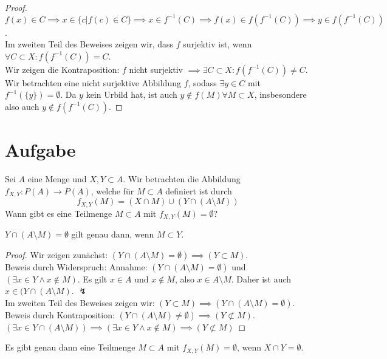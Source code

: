 \documentclass{article}
\begin{document}
\begin{enumerate}[a)]
\begin{proof}
		\[f(x)\in C\implies x \in \{c|f(c)\in C\} \implies x \in f^{-1}(C)\implies f(x) \in f(f^{-1}(C)) \implies y \in f(f^{-1}(C))\].\\
		Im zweiten Teil des Beweises zeigen wir, dass $f$ surjektiv ist, wenn $\forall C\subset X: f(f^{-1}(C)) = C$.\\
		Wir zeigen die Kontraposition: $f$ nicht surjektiv $\implies \exists C \subset X: f(f^{-1}(C)) \neq C$.\\
		Wir betrachten eine nicht surjektive Abbildung $f$, sodass $\exists y \in C$ mit $f^{-1}(\{y\}) = \emptyset$. Da $y$ kein Urbild hat, ist auch $y\notin f(M) \forall M \subset X$, insbesondere also auch $y\notin f(f^{-1}(C))$.
	\end{proof}
	\end{enumerate}
\newpage
\section{Aufgabe}
Sei $A$ eine Menge und $X, Y \subset A$. Wir betrachten die Abbildung $f_{X,Y} : P(A) \to P(A)$, welche für $M \subset A$ definiert ist durch
\[f_{X,Y}(M) = (X \cap M ) \cup (Y \cap (A \setminus M))\]
Wann gibt es eine Teilmenge $M \subset A$ mit $f_{X,Y}(M) = \emptyset$?
\begin{lemma}
	$Y \cap (A \setminus M) = \emptyset$ gilt genau dann, wenn $M\subset Y$.
\end{lemma}
\begin{proof}
	Wir zeigen zunächst: $(Y \cap (A \setminus M) = \emptyset) \implies (Y\subset M)$.\\
	Beweis durch Widerspruch: Annahme: $(Y \cap (A \setminus M) =  \emptyset)$ und $(\exists x \in Y \land x\notin M)$. 
	Es gilt $x \in A$ und $x\notin M$, also $x\in A\setminus M$. Daher ist auch $x\in (Y \cap (A \setminus M)$. $\lightning$\\
	Im zweiten Teil des Beweises zeigen wir: $(Y\subset M) \implies (Y \cap (A \setminus M) = \emptyset)$.\\
	Beweis durch Kontraposition: $(Y \cap (A \setminus M) \neq \emptyset) \implies (Y\not \subset M)$.\\
	$(\exists x \in Y \cap (A \setminus M)) \implies (\exists x \in Y \land x\notin M) \implies (Y\not \subset M)$
\end{proof}
\begin{satz}
	Es gibt genau dann eine Teilmenge $M \subset A$ mit $f_{X,Y}(M) = \emptyset$, wenn $X\cap Y = \emptyset$.
\end{satz}
\end{document}

